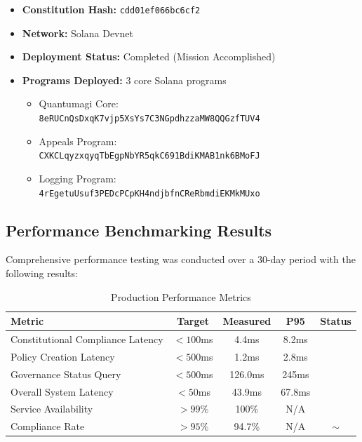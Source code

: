 \documentclass[10pt,twocolumn]{article}
\newcommand{\checkmarkcustom}{\ding{51}}
\theoremstyle{definition}
\begin{document}
\begin{itemize}[leftmargin=*,topsep=2pt,itemsep=2pt,parsep=0pt]
    \item \textbf{Constitution Hash:} \texttt{cdd01ef066bc6cf2}
    \item \textbf{Network:} Solana Devnet
    \item \textbf{Deployment Status:} Completed (Mission Accomplished)
    \item \textbf{Programs Deployed:} 3 core Solana programs
    \begin{itemize}
        \item Quantumagi Core: \\
        \texttt{8eRUCnQsDxqK7vjp5XsYs7C3NGpdhzzaMW8QQGzfTUV4}
        \item Appeals Program: \\
        \texttt{CXKCLqyzxqyqTbEgpNbYR5qkC691BdiKMAB1nk6BMoFJ}
        \item Logging Program: \\
        \texttt{4rEgetuUsuf3PEDcPCpKH4ndjbfnCReRbmdiEKMkMUxo}
    \end{itemize}
\end{itemize}

\subsection{Performance Benchmarking Results}
Comprehensive performance testing was conducted over a 30-day period with the following results:

\begin{table}[H]
\centering
\caption{Production Performance Metrics}
\label{tab:performance_metrics}
\begin{tabular}{@{}lcccc@{}}
\toprule
\textbf{Metric} & \textbf{Target} & \textbf{Measured} & \textbf{P95} & \textbf{Status} \\
\midrule
Constitutional Compliance Latency & $<100$ms & 4.4ms & 8.2ms & \checkmarkcustom \\
Policy Creation Latency & $<500$ms & 1.2ms & 2.8ms & \checkmarkcustom \\
Governance Status Query & $<500$ms & 126.0ms & 245ms & \checkmarkcustom \\
Overall System Latency & $<50$ms & 43.9ms & 67.8ms & \checkmarkcustom \\
Service Availability & $>99\%$ & 100\% & N/A & \checkmarkcustom \\
Compliance Rate & $>95\%$ & 94.7\% & N/A & $\sim$ \\
\bottomrule
\end{tabular}
\end{table}
\end{document}
